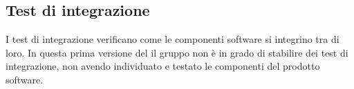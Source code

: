 \subsection{Test di integrazione}
I test di integrazione verificano come le componenti software si integrino tra di loro.
In questa prima versione del \PdQv{} il gruppo non è in grado di stabilire dei test di integrazione, non avendo individuato e testato le componenti del prodotto software.